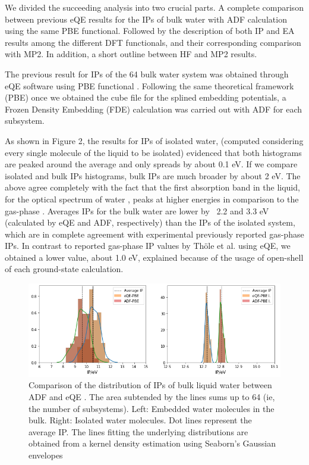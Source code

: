 \documentclass[12pt,a4paper]{article}
\begin{document}
We divided the succeeding analysis into two crucial parts. A complete comparison between previous eQE results \cite{tolle2019charged} for the
IPs of bulk water with ADF calculation using the same PBE functional. Followed by the description of both IP and EA results among the different 
DFT functionals, and their corresponding comparison with MP2. In addition, a short outline between HF and MP2 results.

The previous result for IPs of the 64 bulk water system was obtained through eQE software using PBE functional \cite{tolle2019charged}. Following
the same theoretical framework (PBE) once we obtained the cube file for the splined embedding potentials, a Frozen Density 
Embedding (FDE) calculation was carried out with ADF for each subsystem. 

As shown in Figure 2, the results for IPs of isolated water, (computed considering every single
molecule of the liquid to be isolated) evidenced that both histograms are peaked around the average
and only spreads by about 0.1 eV. If we compare isolated and bulk IPs histograms,
bulk IPs are much broader by about 2 eV. The above agree completely with the fact that the first
absorption band in the liquid, for the optical spectrum of water \cite{blase2016erratum,genova2017cooperation,hermann2008resolving,hahn2005optical},
peaks at higher energies in comparison to the gas-phase \cite{tolle2019charged}. Averages IPs for the bulk water are lower by ~2.2 and 3.3 eV
(calculated by eQE and ADF, respectively) than the IPs of the isolated system, which are in complete agreement
with experimental previously reported \cite{nist2015nist} gas-phase IPs. 
In contrast to reported gas-phase IP values by Th{\"o}le et al.\cite{tolle2019charged} using eQE, we obtained a lower value, about
1.0 eV, explained because of the usage of open-shell of each ground-state calculation.

\begin{figure}[!ht]
        \centering
        \includegraphics[width=\linewidth]{eQE-ADF}
	\caption{Comparison of the distribution of IPs of bulk liquid water between ADF\cite{te2001chemistry} and eQE \cite{genova2017eqe}. The area subtended by the lines sums up to 64 (ie, the number of subsystems). Left: Embedded water molecules in the bulk. Right: Isolated water molecules. Dot lines represent the average IP. The lines fitting the underlying distributions are obtained from a kernel density estimation using Seaborn's Gaussian envelopes\cite{waskom2017c}}
\end{figure}
\end{document}

